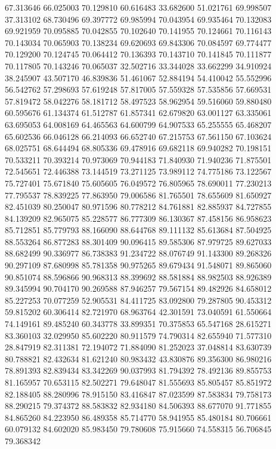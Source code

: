 67.313646
66.025003
70.129810
60.616483
33.682600
51.021761
69.998507
37.313102
68.730496
69.397772
69.985994
70.043954
69.935464
70.132083
69.921959
70.095885
70.042855
70.102640
70.141955
70.124661
70.116143
70.143034
70.065903
70.138234
69.620693
69.843306
70.084597
69.774477
70.129200
70.124745
70.064412
70.136393
70.143710
70.141845
70.111877
70.117805
70.143246
70.065037
32.502716
33.344028
33.662299
34.910924
38.245907
43.507170
46.839836
51.461067
52.884194
54.410042
55.552996
56.542762
57.298693
57.619248
57.817005
57.559328
57.535856
57.669531
57.819472
58.042276
58.181712
58.497523
58.962954
59.516060
59.880480
60.595676
61.134374
61.512787
61.857341
62.679820
63.001127
63.335061
63.695053
64.008169
64.465563
64.600799
64.907533
65.255555
65.468207
65.602536
66.046128
66.214093
66.652740
67.215753
67.561150
67.103624
68.025751
68.644494
68.805336
69.478916
69.682118
69.940282
70.198151
70.533211
70.393214
70.973069
70.944183
71.840930
71.940236
71.875501
72.545651
72.446388
73.144519
73.271125
73.989112
74.775186
73.122567
75.727401
75.671840
75.605605
76.049572
76.805965
78.690011
77.230213
77.795537
78.839225
77.863950
79.006586
81.765501
78.655609
81.650927
82.451039
80.250047
80.971596
80.778212
84.761881
82.885937
84.727855
84.139209
82.965075
85.228577
86.777309
86.130367
87.458156
86.958623
85.712851
85.779793
88.166090
88.644768
89.111132
85.613684
87.504925
88.553264
86.877283
88.301409
90.096415
89.585306
87.979725
89.627033
88.682499
90.336977
86.738383
91.234722
88.076749
91.143300
89.268326
90.297109
87.680998
85.781358
90.975265
89.679434
91.548071
89.865060
90.851074
88.596866
90.968313
88.399692
88.581884
88.982503
88.926389
89.345994
90.704170
90.269588
87.946257
79.567154
89.482926
84.658012
85.227253
70.077259
52.905531
84.411725
83.092800
79.287805
90.453312
59.815202
60.306414
82.721970
68.963764
42.301591
73.040591
61.550664
74.149161
89.485240
60.343778
33.899351
70.375853
65.547168
28.615271
83.360103
32.029950
85.602220
80.911579
74.790314
82.655940
71.577310
28.847919
82.311381
72.194072
71.884090
81.252023
37.048814
83.630739
80.788821
82.432634
81.621240
80.983432
43.830876
89.356300
86.980216
78.891393
82.839434
83.342269
90.037993
81.794392
78.492136
89.855753
81.165957
70.653115
82.502271
79.648047
81.555693
85.805457
85.851972
82.188405
88.280996
78.915150
83.416847
87.023599
87.583834
79.758173
88.290215
79.374372
88.583832
82.934180
84.506393
88.677070
91.771855
84.865260
84.223950
86.489358
85.714770
58.941955
85.480184
80.706661
60.079132
84.602020
85.983450
79.780608
75.915660
74.558315
56.706845
79.368342
